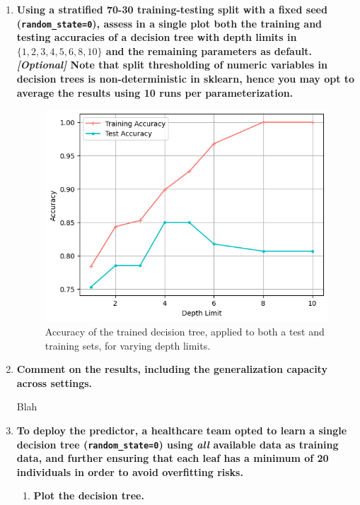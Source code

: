 \documentclass[12pt]{article}
\begin{document}
\begin{enumerate}[leftmargin=\labelsep]
    \item \textbf{Using a stratified 70-30 training-testing split with a fixed seed (\texttt{random\_state=0}), assess in a
          single plot both the training and testing accuracies of a decision tree with depth limits in
          $\{1,2,3,4,5,6,8,10\}$ and the remaining parameters as default.\vskip 0.05cm
          \textit{[Optional]} Note that split thresholding of numeric variables in decision trees is non-deterministic
          in sklearn, hence you may opt to average the results using 10 runs per parameterization.}

          \vskip 0.3cm
          

          \vskip -0.7cm
          \begin{figure}[H]
              \centering
              \includegraphics[width=14cm]{./assets/training_testing_accuracies.png}
              \caption{Accuracy of the trained decision tree, applied to both a test and training sets, for varying depth limits.}
              \label{fig:PartII-ex2-plot}
          \end{figure}

    \item \textbf{Comment on the results, including the generalization capacity across settings.}

          \vskip 0.3cm
          Blah

    \item \textbf{To deploy the predictor, a healthcare team opted to learn a single decision tree
          (\texttt{random\_state=0}) using \textit{all} available data as training data, and further ensuring that each leaf has
          a minimum of 20 individuals in order to avoid overfitting risks.}
          \begin{enumerate}
          \item \textbf{Plot the decision tree.}


\end{enumerate}
\end{enumerate}
\end{document}
